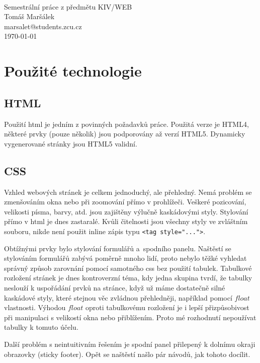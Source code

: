 \documentclass[12pt]{article}
\begin{document}
\begin{titlepage}
\begin{center}
\mbox{} \\[3cm]
\huge{Semestrální práce z předmětu KIV/WEB} \\[2cm]
\Large{Tomáš Maršálek} \\
\large{marsalet@students.zcu.cz} \\[1cm]
\normalsize{\today}
\end{center}
\end{titlepage}

\section{Použité technologie}
\subsection{HTML}
Použití html je jedním z povinných požadavků práce. Použitá verze je HTML4,
některé prvky (pouze několik) jsou podporovány až verzí HTML5. Dynamicky
vygenerované stránky jsou HTML5 validní.

\subsection{CSS}
Vzhled webových stránek je celkem jednoduchý, ale přehledný. Nemá problém se
zmenšováním okna nebo při zoomování přímo v prohlížeči. Veškeré pozicování,
velikosti písma, barvy, atd. jsou zajištěny výlučně kaskádovými styly.
Stylování přímo v html je dnes zastaralé. Kvůli čitelnosti jsou všechny styly
ve zvláštním souboru, nikde není použit inline zápis typu 
\verb|<tag style="...">|. 

Obtížnými prvky bylo stylování formulářů a~spodního panelu. Naštěstí se
stylováním formulářů zabývá poměrně mnoho lidí, proto nebylo těžké vyhledat
správný způsob zarovnání pomocí samotného css bez použití tabulek. Tabulkové
rozložení stránek je dnes kontroverzní téma, kdy jedna skupina tvrdí, že
tabulky neslouží k uspořádání prvků na stránce, když už máme dostatečně silné
kaskádové styly, které stejnou věc zvládnou přehledněji, například pomocí
$float$ vlastnosti.  Výhodou $float$ oproti tabulkovému rozložení je i lepší
přizpůsobivost při manipulaci s velikostí okna nebo přiblížením.  Proto mé
rozhodnutí nepoužívat tabulky k tomuto účelu.

Další problém s neintuitivním řešením je spodní panel přilepený
k dolnímu okraji obrazovky (sticky footer). Opět se naštěstí našlo pár návodů,
jak tohoto docílit.
\end{document}
